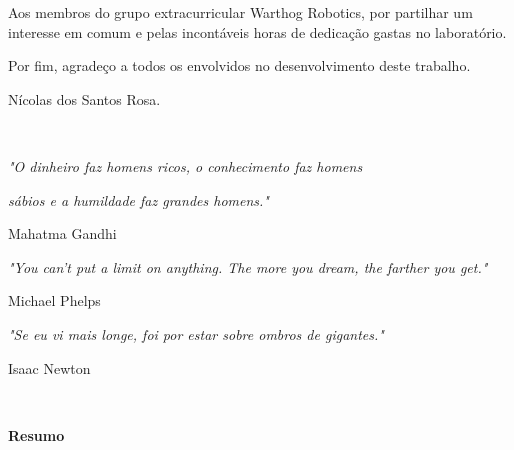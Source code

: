 Aos membros do grupo extracurricular Warthog Robotics, por partilhar um interesse em comum e pelas incontáveis horas de dedicação gastas no laboratório.

Por fim, agradeço a todos os envolvidos no desenvolvimento deste trabalho.

\begin{flushright}
Nícolas dos Santos Rosa.
\end{flushright}


\cleardoublepage

\
\vspace{0.76\textheight} 

\begin{flushright}

\textit{"O dinheiro faz homens ricos, o conhecimento faz homens }

\textit{sábios e a humildade faz grandes homens."}

Mahatma Gandhi

\textit{"You can't put a limit on anything. The more you dream, the farther you get."}

Michael Phelps

\textit{"Se eu vi mais longe, foi por estar sobre ombros de gigantes."}

Isaac Newton

\end{flushright}


\cleardoublepage


\
\vspace{0.11\textheight} 

\begin{center}
\textbf{\Huge{Resumo}}
\end{center}


